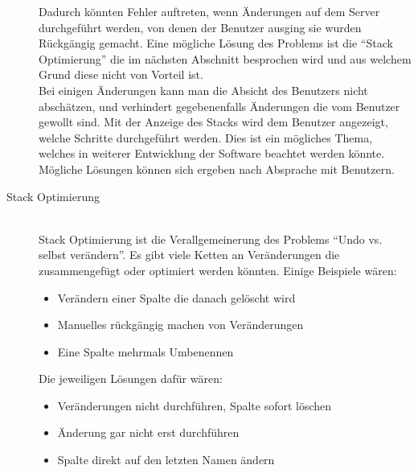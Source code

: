 \begin{description}
Dadurch könnten Fehler auftreten, wenn Änderungen auf dem Server durchgeführt werden, von denen der Benutzer ausging sie wurden Rückgängig gemacht. Eine mögliche Lösung des Problems ist die ``Stack Optimierung'' die im nächsten Abschnitt besprochen wird und aus welchem Grund diese nicht von Vorteil ist. \\
Bei einigen Änderungen kann man die Absicht des Benutzers nicht abschätzen, und verhindert gegebenenfalls Änderungen die vom Benutzer gewollt sind. Mit der Anzeige des Stacks wird dem Benutzer angezeigt, welche Schritte durchgeführt werden.
Dies ist ein mögliches Thema, welches in weiterer Entwicklung der Software beachtet werden könnte. Mögliche Lösungen können sich ergeben nach Absprache mit Benutzern. 

\item[Stack Optimierung] \hfill\\
Stack Optimierung ist die Verallgemeinerung des Problems ``Undo vs. selbst verändern''. Es gibt viele Ketten an Veränderungen die zusammengefügt oder optimiert werden könnten. Einige Beispiele wären:
\begin{itemize}
    \item Verändern einer Spalte die danach gelöscht wird
    \item Manuelles rückgängig machen von Veränderungen
    \item Eine Spalte mehrmals Umbenennen
\end{itemize}

Die jeweiligen Lösungen dafür wären:
\begin{itemize}
    \item Veränderungen nicht durchführen, Spalte sofort löschen
    \item Änderung gar nicht erst durchführen
    \item Spalte direkt auf den letzten Namen ändern
\end{itemize}


\end{description}
